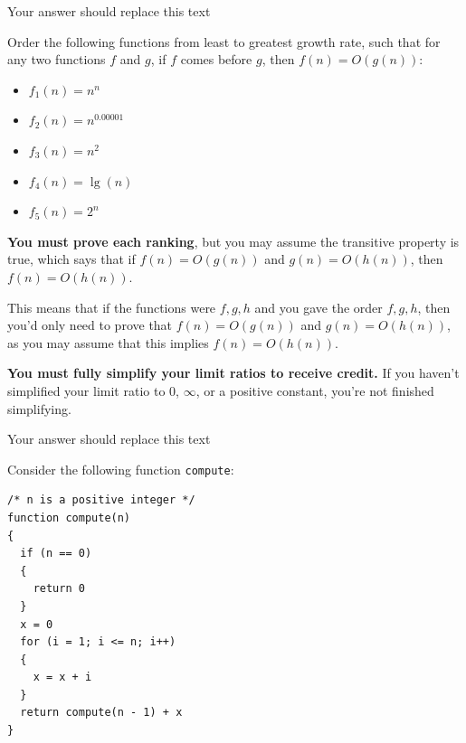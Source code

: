 \documentclass[answers,addpoints,11pt]{exam}
\begin{document}
\begin{questions}
\begin{parts}
\begin{solution}
Your answer should replace this text
\end{solution}

\end{parts}

\question[20]
    Order the following functions from least to greatest growth rate, such that for any two functions $f$ and $g$, if $f$ comes before $g$, then $f(n) = O(g(n))$:

\begin{itemize}
\item $f_1(n) = n^n$
\item $f_2(n) = n^{0.00001}$
\item $f_3(n) = n^2$
\item $f_4(n) = \lg(n)$
\item $f_5(n) = 2^n$
\end{itemize}

\textbf{You must prove each ranking}, but you may assume the transitive property is true, which says that if $f(n) = O(g(n))$ and $g(n) = O(h(n))$, then $f(n) = O(h(n))$.

This means that if the functions were $f, g, h$ and you gave the order $f, g, h$, then you'd only need to prove that $f(n) = O(g(n))$ and $g(n)= O(h(n))$, as you may assume that this implies $f(n) = O(h(n))$.

\textbf{You must fully simplify your limit ratios to receive credit.} If you haven't simplified your limit ratio to 0, $\infty$, or a positive constant, you're not finished simplifying.


\begin{solution}
Your answer should replace this text
\end{solution}

\question
Consider the following function \texttt{compute}:

\begin{lstlisting}
/* n is a positive integer */
function compute(n) 
{
  if (n == 0) 
  {
    return 0
  }
  x = 0
  for (i = 1; i <= n; i++) 
  {
    x = x + i
  }
  return compute(n - 1) + x
}
\end{lstlisting}

\end{questions}
\end{document}
